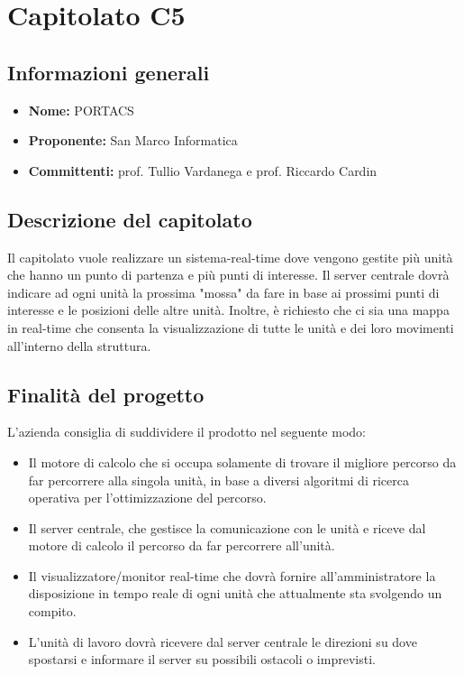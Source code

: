 \section{Capitolato C5}

\subsection{Informazioni generali}
\begin{itemize}
\item \textbf{Nome:} PORTACS
\item \textbf{Proponente:} San Marco Informatica
\item \textbf{Committenti:} prof. Tullio Vardanega e prof. Riccardo Cardin
\end{itemize}

\subsection{Descrizione del capitolato}
Il capitolato vuole realizzare un sistema-real-time dove vengono gestite più unità che hanno un punto di partenza e più punti di interesse.
Il server centrale dovrà indicare ad ogni unità la prossima "mossa" da fare in base ai prossimi punti di interesse e le posizioni delle altre unità. 
Inoltre, è richiesto che ci sia una mappa in real-time che consenta la visualizzazione di tutte le unità e dei loro movimenti all'interno della struttura.

\subsection{Finalità del progetto}
L'azienda consiglia di suddividere il prodotto nel seguente modo:
\begin{itemize}
\item Il motore di calcolo che si occupa solamente di trovare il migliore percorso da far percorrere alla singola unità, in base a diversi algoritmi di ricerca operativa per l'ottimizzazione del percorso.
\item Il server centrale, che gestisce la comunicazione con le unità e riceve dal motore di calcolo il percorso da far percorrere all'unità.
\item Il visualizzatore/monitor real-time che dovrà fornire all'amministratore la disposizione in tempo reale di ogni unità che attualmente sta svolgendo un compito.
\item L'unità di lavoro dovrà ricevere dal server centrale le direzioni su dove spostarsi e informare il server su possibili ostacoli o imprevisti.
\end{itemize}

